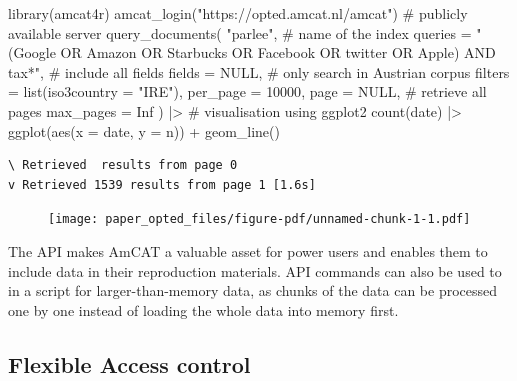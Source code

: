 \documentclass[
  a4paper,
  DIV=11,
  numbers=noendperiod]{scrartcl}
\newenvironment{Shaded}{\begin{snugshade}}{\end{snugshade}}
\newcommand{\AttributeTok}[1]{\textcolor[rgb]{0.40,0.45,0.13}{#1}}
\newcommand{\CommentTok}[1]{\textcolor[rgb]{0.37,0.37,0.37}{#1}}
\newcommand{\ConstantTok}[1]{\textcolor[rgb]{0.56,0.35,0.01}{#1}}
\newcommand{\DecValTok}[1]{\textcolor[rgb]{0.68,0.00,0.00}{#1}}
\newcommand{\FunctionTok}[1]{\textcolor[rgb]{0.28,0.35,0.67}{#1}}
\newcommand{\NormalTok}[1]{\textcolor[rgb]{0.00,0.23,0.31}{#1}}
\newcommand{\SpecialCharTok}[1]{\textcolor[rgb]{0.37,0.37,0.37}{#1}}
\newcommand{\StringTok}[1]{\textcolor[rgb]{0.13,0.47,0.30}{#1}}
\begin{document}
\begin{Shaded}
\begin{Highlighting}[]
\FunctionTok{library}\NormalTok{(amcat4r)}
\FunctionTok{amcat\_login}\NormalTok{(}\StringTok{"https://opted.amcat.nl/amcat"}\NormalTok{) }\CommentTok{\# publicly available server}
\FunctionTok{query\_documents}\NormalTok{(}
  \StringTok{"parlee"}\NormalTok{, }\CommentTok{\# name of the index}
  \AttributeTok{queries =} \StringTok{"(Google OR Amazon OR Starbucks OR Facebook OR twitter OR Apple) AND tax*"}\NormalTok{, }
  \CommentTok{\# include all fields}
  \AttributeTok{fields =} \ConstantTok{NULL}\NormalTok{,}
  \CommentTok{\# only search in Austrian corpus}
  \AttributeTok{filters   =} \FunctionTok{list}\NormalTok{(}\AttributeTok{iso3country =} \StringTok{"IRE"}\NormalTok{), }
  \AttributeTok{per\_page =} \DecValTok{10000}\NormalTok{, }
  \AttributeTok{page =} \ConstantTok{NULL}\NormalTok{, }\CommentTok{\# retrieve all pages}
  \AttributeTok{max\_pages =} \ConstantTok{Inf}
\NormalTok{) }\SpecialCharTok{|\textgreater{}} 
  \CommentTok{\# visualisation using ggplot2}
  \FunctionTok{count}\NormalTok{(date) }\SpecialCharTok{|\textgreater{}}
  \FunctionTok{ggplot}\NormalTok{(}\FunctionTok{aes}\NormalTok{(}\AttributeTok{x =}\NormalTok{ date, }\AttributeTok{y =}\NormalTok{ n)) }\SpecialCharTok{+}
  \FunctionTok{geom\_line}\NormalTok{()}
\end{Highlighting}
\end{Shaded}

\begin{verbatim}
\ Retrieved  results from page 0
v Retrieved 1539 results from page 1 [1.6s]
\end{verbatim}

\begin{figure}[H]

{\centering \texttt{[image: paper\_opted\_files/figure-pdf/unnamed-chunk-1-1.pdf]}

}

\end{figure}

The API makes AmCAT a valuable asset for power users and enables them to
include data in their reproduction materials. API commands can also be
used to in a script for larger-than-memory data, as chunks of the data
can be processed one by one instead of loading the whole data into
memory first.

\hypertarget{flexible-access-control}{%
\subsection{Flexible Access control}\label{flexible-access-control}}
\end{document}
